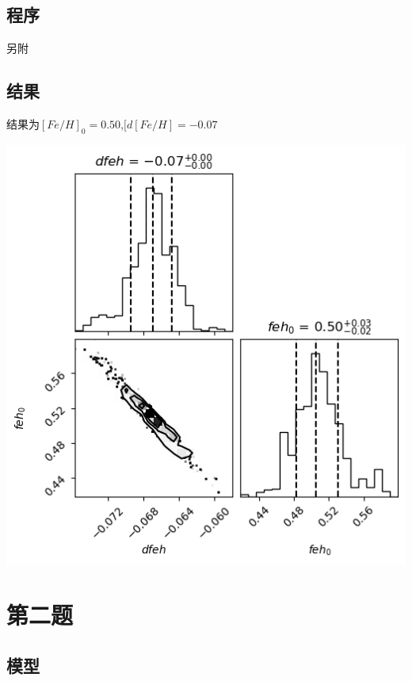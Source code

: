 \documentclass[12pt, letterpaper]{article}
\begin{document}
\subsection{程序}
另附
\subsection{结果}
结果为$[Fe/H]_0=0.50$,$[d[Fe/H]=-0.07$

\includegraphics[scale=0.7]{1.png}


\section{第二题}
\subsection{模型}
\end{document}
